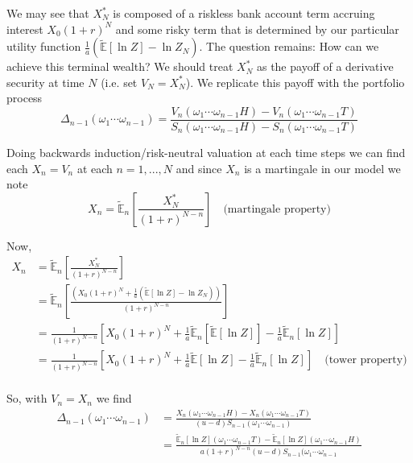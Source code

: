 \documentclass[12pt]{article}
\newlength\tindent
\renewcommand{\indent}{\hspace*{\tindent}}
\newcommand{\E}{\mathbb E}
\begin{document}
\indent We may see that $X^*_N$ is composed of a riskless bank account term accruing interest $X_0(1 + r)^N$ and some risky term that is determined by our particular utility function $\frac{1}{a} \left( \tilde{\E}[\ln Z] - \ln Z_N \right)$. The question remains: How can we achieve this terminal wealth? We should treat $X^*_N$ as the payoff of a derivative security at time $N$ (i.e. set $V_N = X^*_N$). We replicate this payoff with the portfolio process
\begin{equation*}
	\Delta_{n - 1}(\omega_1\cdots\omega_{n - 1}) = \frac{ V_n(\omega_1\cdots\omega_{n - 1}H) - V_n(\omega_1\cdots\omega_{n - 1}T) }{ S_n(\omega_1\cdots\omega_{n - 1}H) - S_n(\omega_1\cdots\omega_{n - 1}T) }
\end{equation*}

\indent Doing backwards induction/risk-neutral valuation at each time steps we can find each $X_n = V_n$ at each $n = 1, ..., N$ and since $X_n$ is a martingale in our model we note
\begin{equation*}
	X_n = \tilde{\E}_n \left[ \frac{ X^*_N }{(1 + r)^{N - n}} \right] \quad \text{(martingale property)}
\end{equation*}

Now,
\begin{align*}
	X_n &= \tilde{\E}_n \left[ \frac{ X^*_N }{(1 + r)^{N - n}} \right] \\
	&= \tilde{\E}_n \left[ \frac{ \left( X_0(1 + r)^N + \frac{1}{a} \left( \tilde{\E}[\ln Z] - \ln Z_N \right) \right) }{(1 + r)^{N - n}} \right] \\
	&= \frac{1}{(1 + r)^{N - n}} \left[ X_0(1 + r)^N + \frac{1}{a} \tilde{\E}_n \left[ \tilde{\E}[\ln Z] \right] - \frac{1}{a} \tilde{\E}_n [\ln Z] \right] \\
	&= \frac{1}{(1 + r)^{N - n}} \left[ X_0(1 + r)^N + \frac{1}{a} \tilde{\E}[\ln Z] - \frac{1}{a} \tilde{\E}_n [\ln Z] \right] \quad \text{(tower property)} \\
\end{align*}

So, with $V_n = X_n$ we find
\begin{align*}
	\Delta_{n - 1}(\omega_1\cdots\omega_{n - 1}) &= \frac{ X_n(\omega_1\cdots\omega_{n - 1}H) - X_n(\omega_1\cdots\omega_{n - 1}T) }{ (u - d)S_{n - 1}(\omega_1\cdots\omega_{n - 1}) } \\
	&= \frac{ \tilde{\E}_n[\ln Z](\omega_1\cdots\omega_{n - 1}T) - \tilde{\E}_n[\ln Z](\omega_1\cdots\omega_{n - 1}H) }{ a(1 + r)^{N - n}(u - d)S_{n - 1}(\omega_1\cdots\omega_{n - 1} }
\end{align*}
\end{document}
